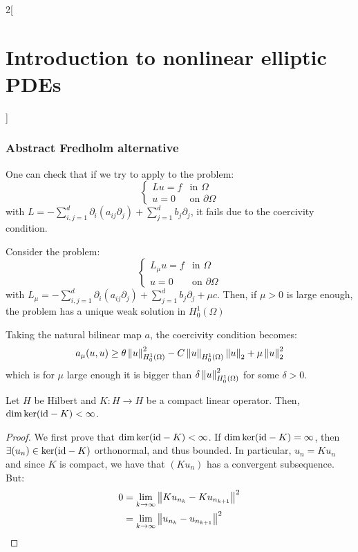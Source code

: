 \documentclass[../../../main_math.tex]{subfiles}
\begin{document}
\begin{multicols}{2}[\section{Introduction to nonlinear elliptic PDEs}]
  \subsubsection{Abstract Fredholm alternative}
  \begin{remark}
    One can check that if we try to apply  to the problem:
    $$
      \begin{cases}
        Lu=f & \text{in }\Omega         \\
        u=0  & \text{on }\partial\Omega
      \end{cases}
    $$
    with $L=-\sum_{i,j=1}^d\partial_i(a_{ij}\partial_j)+\sum_{j=1}^db_j\partial_j$, it fails due to the coercivity condition.
  \end{remark}
  \begin{proposition}
    Consider the problem:
    $$
      \begin{cases}
        L_\mu u=f & \text{in }\Omega         \\
        u=0       & \text{on }\partial\Omega
      \end{cases}
    $$
    with $L_\mu=-\sum_{i,j=1}^d\partial_i(a_{ij}\partial_j)+\sum_{j=1}^db_j\partial_j+\mu c$. Then, if $\mu>0$ is large enough, the problem has a unique weak solution in $H_0^1(\Omega)$
  \end{proposition}
  \begin{sproof}
    Taking the natural bilinear map $a$, the coercivity condition becomes:
    $$
      a_\mu(u,u)\geq \theta \left\|u\right\|_{H_0^1(\Omega)}^2-C\left\|u\right\|_{H_0^1(\Omega)}\left\|u\right\|_2 + \mu \left\|u\right\|_2^2
    $$
    which is for $\mu$ large enough it is bigger than $\delta \left\|u\right\|_{H_0^1(\Omega)}^2$ for some $\delta>0$.
  \end{sproof}
  \begin{lemma}\label{INEPDE:lemma1_fredholm}
    Let $H$ be Hilbert and $K:H\to H$ be a compact linear operator. Then, $\dim \ker(\mathrm{id}-K)<\infty$.
  \end{lemma}
  \begin{proof}
    We first prove that $\dim\ker(\mathrm{id}-K)<\infty$. If $\dim\ker(\mathrm{id}-K)=\infty$, then $\exists (u_n)\in \ker(\mathrm{id}-K)$ orthonormal, and thus bounded. In particular, $u_n=Ku_n$ and since $K$ is compact, we have that $(Ku_n)$ has a convergent subsequence. But:
    \begin{align*}
      0 & =\lim_{k\to\infty}\norm{Ku_{n_k}-Ku_{n_{k+1}}}^2        \\
        & =\lim_{k\to\infty}\norm{u_{n_k}-u_{n_{k+1}}}^2          \\

\end{align*}
\end{proof}
\end{multicols}
\end{document}
